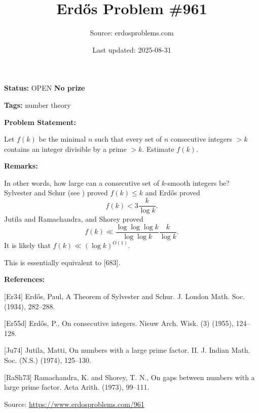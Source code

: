 \documentclass{article}
\title{Erd\H{o}s Problem \#961}
\date{Last updated: 2025-08-31}
\author{Source: erdosproblems.com}
\begin{document}
\maketitle

\noindent\textbf{Status:} OPEN \quad \textbf{No prize}

\noindent\textbf{Tags:} number theory

\medskip
\noindent\textbf{Problem Statement:}

Let $f(k)$ be the minimal $n$ such that every set of $n$ consecutive integers $>k$ contains an integer divisible by a prime $>k$. Estimate $f(k)$.

\bigskip
\noindent\textbf{Remarks:}

In other words, how large can a consecutive set of $k$-smooth integers be? Sylvester and Schur (see \cite{Er34}) proved $f(k)\leq k$ and Erd\H{o}s \cite{Er55d} proved\[f(k)<3\frac{k}{\log k}.\]Jutila \cite{Ju74} and Ramachandra, and Shorey \cite{RaSh73} proved\[f(k) \ll \frac{\log\log\log k}{\log \log k}\frac{k}{\log k}.\]It is likely that $f(k) \ll (\log k)^{O(1)}$.

This is essentially equivalent to [683].

\bigskip
\noindent\textbf{References:}

[Er34] Erd\H{o}s, Paul, A Theorem of Sylvester and Schur. J. London Math. Soc. (1934), 282--288.
 
 [Er55d] Erd\H{o}s, P., On consecutive integers. Nieuw Arch. Wisk. (3) (1955), 124--128.
 
 [Ju74] Jutila, Matti, On numbers with a large prime factor. {II}. J. Indian Math. Soc. (N.S.) (1974), 125--130.
 
 [RaSh73] Ramachandra, K. and Shorey, T. N., On gaps between numbers with a large prime factor. Acta Arith. (1973), 99--111.

\bigskip
\noindent\small{Source: \url{https://www.erdosproblems.com/961}}
\end{document}
